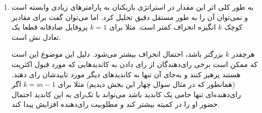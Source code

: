 \documentclass[12pt]{article}
\begin{document}
\begin{enumerate}
{            اما اگر بازیکن شماره $1$
            به جای رای صادقانه، تنها به $c_2$
            رای دهد، آنگاه خواهیم داشت:
            \begin{align*}
                Score_{PAV}(\{c_1, c_4, c_2\}) &= 4 + \frac{4}{2} + \frac{4}{3} = 7.33 \\
                Score_{PAV}(\{c_1, c_4, c_3\}) &= 4 + \frac{4}{2} + \frac{3}{3} = 7\\
            \end{align*}
            بنابراین کمیته نهایی
            $c_1, c_4, c_2$
            خواهد بود، که یعنی سود بازیکن اول برابر $2$
            خواهد شد. بنابراین این بازیکن انگیزه انحراف دارد و پروفایل صادقانه 
            تعادل نش نیست.

            همین مثال برای 
            هم نشان می‌دهد که در این قاعده نیز پروفایل صادقانه لزوما تعادل نش نیست.

            همانطور که توضیح داده شد، تفاوت بنیادین این قواعد با قاعده 
            اول این است که امتیاز برای هر کمیته تعریف می‌شود و انتخاب کاندیدها
            به همدیگر ربط دارد. مثلا در این بازی، بازیکن اول از آنجایی که می‌داند
            با توجه به رای دیگران کاندید $c_1$
            انتخاب می‌شود، می‌تواند با تک‌رای به $c_2$
            ارزش حضور این کاندید در کمیته نهایی را افزایش دهد و کاری کند او
            به جای 
            $c_3$ 
            قرار بگیرد. دلیل این موضوع این است که این دو قاعده تلاش می‌کنند کمیته نهایی
            تنها از رای اکثریت تشکیل نشود و گروه‌های کوچکتر که نسبت خوبی در جمعیت دارند
            هم نماینده داشته باشند.
        }
        \item {
            به طور کلی اثر این مقدار در استراتژی بازیکنان به پارامترهای زیادی وابسته
            است و نمی‌توان آن را به طور مستقل دقیق تحلیل کرد.
            اما می‌توان گفت برای مقادیر کوچک $k$
            انگیزه انحراف کمتر است. مثلا برای $k=1$
            پروفایل صادقانه قطعا یک تعادل نش است.

            هرچقدر 
            $k$
            بزرگتر باشد، احتمال انحراف بیشتر می‌شود. دلیل این موضوع این است که ممکن است
            برخی رای‌دهندگان از رای دادن به کاندیدهایی که مورد قبول اکثریت هستند
            پرهیز کنند و به‌جای آن تنها به کاندیدهای دیگر مورد تاییدشان رای دهند.
            (همانطور که در مثال سوال چهار این بخش دیدیم)
            مثلا برای
            $k=m-1$
            اگر رای‌دهنده‌ای 
            تنها حامی یک کاندید باشد می‌تواند با تک‌رای به این کاندید
            احتمال حضور او را در کمیته بیشتر کند و مطلوبیت رای‌دهنده افزایش پیدا کند.
        }
\end{enumerate}
\end{document}
